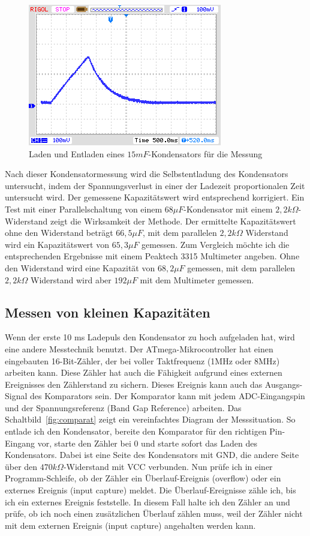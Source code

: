 \begin{figure}[H]
  \centering
    \includegraphics[]{../PNG/charge_15mF.png}
  \caption{Laden und Entladen eines \(15mF\)-Kondensators für die Messung}
  \label{pic:c15mF}
\end{figure}

Nach dieser Kondensatormessung wird die Selbstentladung des Kondensators untersucht, indem der
Spannungsverlust in einer der Ladezeit proportionalen Zeit untersucht wird.
Der gemessene Kapazitätswert wird entsprechend korrigiert. Ein Test mit einer Parallelschaltung von
einem \(68 \mu F\)-Kondensator mit einem \(2,2 k\Omega\)-Widerstand zeigt die
Wirksamkeit der Methode. Der ermittelte Kapazitätswert ohne den Widerstand beträgt \(66,5 \mu F\),
mit dem parallelen \(2,2 k\Omega\) Widerstand wird ein Kapazitätswert von \(65,3 \mu F\) gemessen.
Zum Vergleich möchte ich die entsprechenden Ergebnisse mit einem Peaktech 3315 Multimeter angeben.
Ohne den Widerstand wird eine Kapazität von \(68,2 \mu F\) gemessen, mit dem parallelen \(2,2 k\Omega\)
Widerstand wird aber \(192 \mu F\) mit dem Multimeter gemessen.

\subsection{Messen von kleinen Kapazitäten}
Wenn der erste 10 ms Ladepuls den Kondensator zu hoch aufgeladen hat, wird eine andere Messtechnik benutzt.
Der ATmega-Mikrocontroller hat einen eingebauten 16-Bit-Zähler, der bei voller Taktfrequenz (1MHz oder 8MHz) arbeiten kann.
Diese Zähler hat auch die Fähigkeit aufgrund eines externen Ereignisses den Zählerstand zu sichern.
Dieses Ereignis kann auch das Ausgangs-Signal des Komparators sein.
Der Komparator kann mit jedem ADC-Eingangspin und der Spannungsreferenz (Band Gap Reference) arbeiten.
Das Schaltbild~\ref{fig:comparat} zeigt ein vereinfachtes Diagram der Messsituation.
So entlade ich den Kondensator, bereite den Komparator für den richtigen Pin-Eingang vor, starte den Zähler bei 0 und
starte sofort das Laden des Kondensators.
Dabei ist eine Seite des Kondensators mit GND, die andere Seite über den \(470k\Omega\)-Widerstand mit VCC verbunden.
Nun prüfe ich in einer Programm-Schleife, ob der Zähler ein Überlauf-Ereignis (overflow) oder ein
 externes Ereignis (input capture) meldet.
Die Überlauf-Ereignisse zähle ich, bis ich ein externes Ereignis feststelle.
In diesem Fall halte ich den Zähler an und prüfe, ob ich noch einen zusätzlichen Überlauf zählen muss, 
weil der Zähler nicht mit dem externen Ereignis (input capture) angehalten werden kann.


